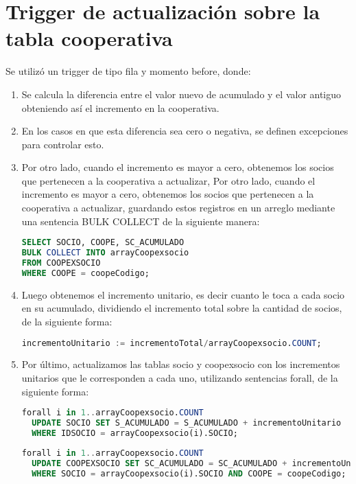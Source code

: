 \documentclass{article}
\begin{document}
\section{Trigger de actualización sobre la tabla cooperativa}
Se utilizó un trigger de tipo fila y momento before, donde:
\begin{enumerate}
        \item Se calcula la diferencia entre el valor nuevo de acumulado y el valor antiguo obteniendo así el incremento en la cooperativa.
        \item En los casos en que esta diferencia sea cero o negativa, se definen excepciones para controlar esto.
        \item Por otro lado, cuando el incremento es mayor a cero, obtenemos los socios que pertenecen a la cooperativa a actualizar, Por otro lado, cuando el incremento es mayor a cero, obtenemos los socios que pertenecen a la cooperativa a actualizar, guardando estos registros en un arreglo mediante una sentencia BULK COLLECT de la siguiente manera:
\begin{lstlisting}[language=SQL]
SELECT SOCIO, COOPE, SC_ACUMULADO 
BULK COLLECT INTO arrayCoopexsocio
FROM COOPEXSOCIO
WHERE COOPE = coopeCodigo;
\end{lstlisting}
\item Luego obtenemos el incremento unitario, es decir cuanto le toca a cada socio en su acumulado, dividiendo el incremento total sobre la cantidad de socios, de la siguiente forma:

\begin{lstlisting}[language=SQL]
incrementoUnitario := incrementoTotal/arrayCoopexsocio.COUNT;
\end{lstlisting}
\item Por último, actualizamos las tablas socio y coopexsocio con los incrementos unitarios que le corresponden a cada uno, utilizando sentencias forall, de la siguiente forma:
\begin{lstlisting}[language=SQL]
forall i in 1..arrayCoopexsocio.COUNT
  UPDATE SOCIO SET S_ACUMULADO = S_ACUMULADO + incrementoUnitario
  WHERE IDSOCIO = arrayCoopexsocio(i).SOCIO;

\end{lstlisting}
\begin{lstlisting}[language=SQL]
forall i in 1..arrayCoopexsocio.COUNT
  UPDATE COOPEXSOCIO SET SC_ACUMULADO = SC_ACUMULADO + incrementoUnitario
  WHERE SOCIO = arrayCoopexsocio(i).SOCIO AND COOPE = coopeCodigo;
\end{lstlisting}
\end{enumerate}
\end{document}
